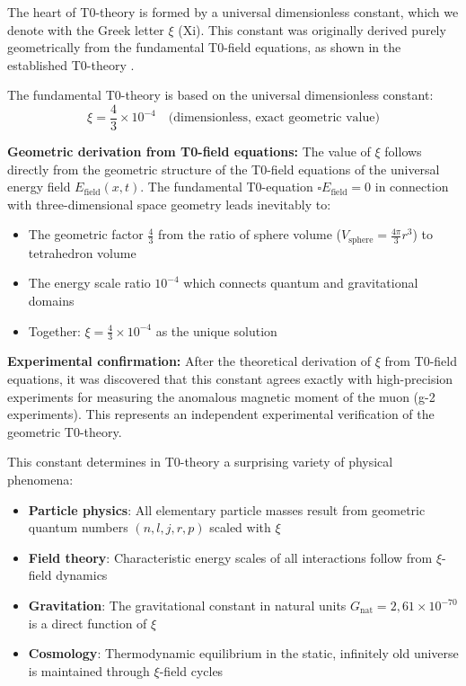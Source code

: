 \documentclass[12pt,a4paper]{article}
\theoremstyle{definition}
\theoremstyle{remark}
\begin{document}
	The heart of T0-theory is formed by a universal dimensionless constant, which we denote with the Greek letter $\xi$ (Xi). This constant was originally derived purely geometrically from the fundamental T0-field equations, as shown in the established T0-theory \cite{T0Theory}.
	
	The fundamental T0-theory is based on the universal dimensionless constant:
	\begin{equation}
		\xi = \frac{4}{3} \times 10^{-4} \quad \text{(dimensionless, exact geometric value)}
	\end{equation}
	
	\textbf{Geometric derivation from T0-field equations:} The value of $\xi$ follows directly from the geometric structure of the T0-field equations of the universal energy field $E_{\text{field}}(x,t)$. The fundamental T0-equation $\square E_{\text{field}} = 0$ in connection with three-dimensional space geometry leads inevitably to:
	\begin{itemize}
		\item The geometric factor $\frac{4}{3}$ from the ratio of sphere volume ($V_{\text{sphere}} = \frac{4\pi}{3}r^3$) to tetrahedron volume
		\item The energy scale ratio $10^{-4}$ which connects quantum and gravitational domains
		\item Together: $\xi = \frac{4}{3} \times 10^{-4}$ as the unique solution
	\end{itemize}
	
	\textbf{Experimental confirmation:} After the theoretical derivation of $\xi$ from T0-field equations, it was discovered that this constant agrees exactly with high-precision experiments for measuring the anomalous magnetic moment of the muon (g-2 experiments). This represents an independent experimental verification of the geometric T0-theory.
	
	This constant determines in T0-theory a surprising variety of physical phenomena:
	\begin{itemize}
		\item \textbf{Particle physics}: All elementary particle masses result from geometric quantum numbers $(n,l,j,r,p)$ scaled with $\xi$
		\item \textbf{Field theory}: Characteristic energy scales of all interactions follow from $\xi$-field dynamics
		\item \textbf{Gravitation}: The gravitational constant in natural units $G_{\text{nat}} = 2{,}61 \times 10^{-70}$ is a direct function of $\xi$
		\item \textbf{Cosmology}: Thermodynamic equilibrium in the static, infinitely old universe is maintained through $\xi$-field cycles
	\end{itemize}
	
\end{document}
